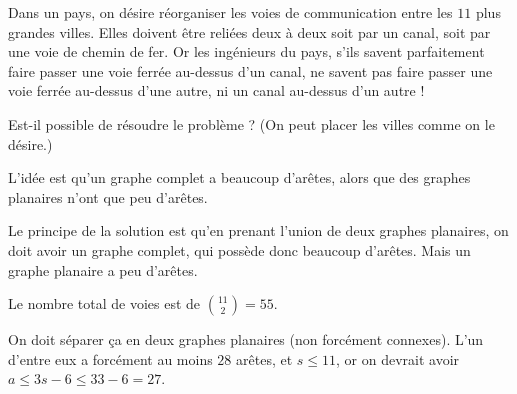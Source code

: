 \begin{exo}
Dans un pays, on désire réorganiser les voies de communication entre les $11$ plus grandes villes. Elles doivent être reliées deux à deux soit par un canal, soit par une voie de chemin de fer. Or les ingénieurs du pays, s'ils savent parfaitement faire passer une voie ferrée au-dessus d'un canal, ne savent pas faire passer une voie ferrée au-dessus d'une autre, ni un canal au-dessus d'un autre !

Est-il possible de résoudre le problème ? (On peut placer les villes comme on le désire.)
\begin{hint}
L'idée est qu'un graphe complet a \og beaucoup\fg{} d'arêtes, alors que des graphes planaires n'ont que \og peu\fg{} d'arêtes.
\end{hint}
\begin{sol}
Le principe de la solution est qu'en prenant l'union de deux graphes planaires, on doit avoir un graphe complet, qui possède donc beaucoup d'arêtes.
Mais un graphe planaire a \og peu\fg{} d'arêtes.



Le nombre total de voies est de $\binom{11}{2} = 55$.

On doit séparer ça en deux graphes planaires (non forcément connexes). L'un d'entre eux a forcément au moins $28$ arêtes, et $s\leq 11$, or on devrait avoir $a\leq 3s-6 \leq 33-6 = 27$.
\end{sol}
\end{exo}


















